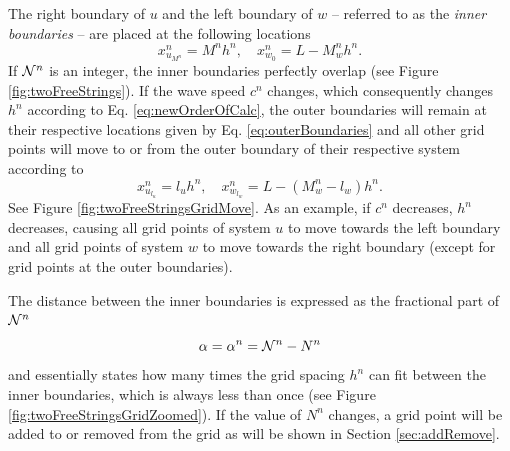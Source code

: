 The right boundary of $u$ and the left boundary of $w$ -- referred to as the \textit{inner boundaries} -- are placed at the following locations 
\begin{equation}\label{eq:hLocs}
    x_{u_{M^n}}^n = M^nh^n, \quad x_{w_{0}}^n = L-M_w^nh^n.
\end{equation}
If $\mathcal{N}^n$ is an integer, the inner boundaries perfectly overlap (see Figure \ref{fig:twoFreeStrings}). If the wave speed $c^n$ changes, which consequently changes $h^n$ according to Eq. \eqref{eq:newOrderOfCalc}, the outer boundaries will remain at their respective locations given by Eq. \eqref{eq:outerBoundaries} and all other grid points will move to or from the outer boundary of their respective system according to 
\begin{equation}\label{eq:hLocs}
    x_{u_{l_u}}^n =l_uh^n, \quad x_{w_{l_w}}^n = L-(M_w^n-l_w)h^n.
\end{equation}
See Figure \ref{fig:twoFreeStringsGridMove}. As an example, if $c^n$ decreases, $h^n$ decreases, causing all grid points of system $u$ to move towards the left boundary and all grid points of system $w$ to move towards the right boundary (except for grid points at the outer boundaries).

The distance between the inner boundaries is expressed as the fractional part of $\mathcal{N}^n$
\begin{equation}\label{eq:alphaDef}
    \alpha = \alpha^n = \mathcal{N}^n - N^n
\end{equation}
and essentially states how many times the grid spacing $h^n$ can fit between the inner boundaries, which is always less than once (see Figure \ref{fig:twoFreeStringsGridZoomed}). If the value of $N^n$ changes, a grid point will be added to or removed from the grid as will be shown in Section \ref{sec:addRemove}.

